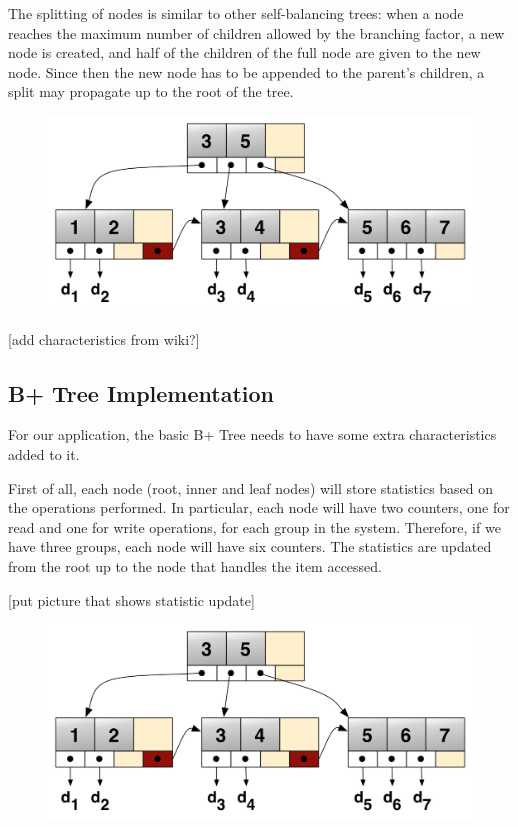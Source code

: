 The splitting of nodes is similar to other self-balancing trees: when a node reaches the maximum number of children allowed by the branching factor, a new node is created, and half of the children of the full node are given to the new node. Since then the new node has to be appended to the parent's children, a split may propagate up to the root of the tree.

\begin{figure}[!htb]
    \centering
    \includegraphics[width=\textwidth,height=\textheight,keepaspectratio]{img/b+tree.png}
    \caption[caption]{ }
    \label{fig:b+tree}
\end{figure}

[add characteristics from wiki?]

\subsection{B+ Tree Implementation}\label{sec:b+tree-implementation}
For our application, the basic B+ Tree needs to have some extra characteristics added to it. 

First of all, each node (root, inner and leaf nodes) will store statistics based on the operations performed. In particular, each node will have two counters, one for read and one for write operations, for each group in the system. Therefore, if we have three groups, each node will have six counters. The statistics are updated from the root up to the node that handles the item accessed.

[put picture that shows statistic update]
\begin{figure}[!htb]
  \centering
  \includegraphics[width=\textwidth,height=\textheight,keepaspectratio]{img/b+tree.png}
  \caption[caption]{ }
  \label{fig:b+tree}
\end{figure}


